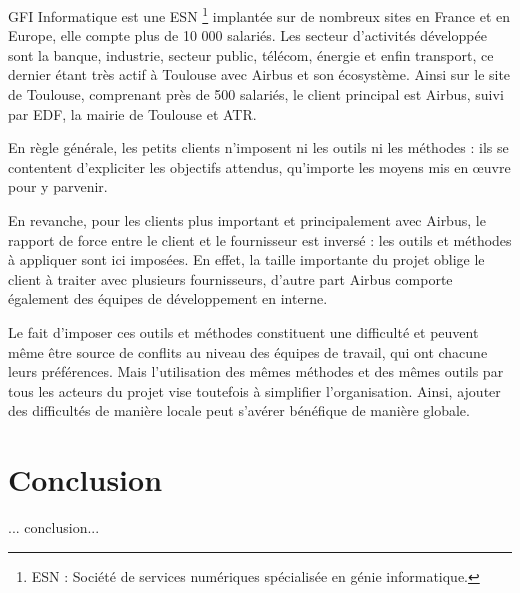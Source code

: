 GFI Informatique est une \gls{ESN} \footnote{ESN : Société de services numériques spécialisée en génie informatique.} implantée sur de nombreux sites en France et en Europe, elle compte plus de 10 000 salariés. Les secteur d'activités développée sont la banque, industrie, secteur public, télécom, énergie et enfin transport, ce dernier étant très actif à Toulouse avec Airbus et son écosystème. Ainsi sur le site de Toulouse, comprenant près de 500 salariés, le client principal est Airbus, suivi par EDF, la mairie de Toulouse et ATR.

En règle générale, les petits clients n'imposent ni les outils ni les méthodes : ils se contentent d'expliciter les objectifs attendus, qu'importe les moyens mis en œuvre pour y parvenir.

En revanche, pour les clients plus important et principalement avec Airbus, le rapport de force entre le client et le fournisseur est inversé : les outils et méthodes à appliquer sont ici imposées. En effet, la taille importante du projet oblige le client à traiter avec plusieurs fournisseurs, d'autre part Airbus comporte également des équipes de développement en interne.

Le fait d'imposer ces outils et méthodes constituent une difficulté et peuvent même être source de conflits au niveau des équipes de travail, qui ont chacune leurs préférences. Mais l'utilisation des mêmes méthodes et des mêmes outils par tous les acteurs du projet vise toutefois à simplifier l'organisation. Ainsi, ajouter des difficultés de manière locale peut s'avérer bénéfique de manière globale.

\section{Conclusion}

... conclusion...
